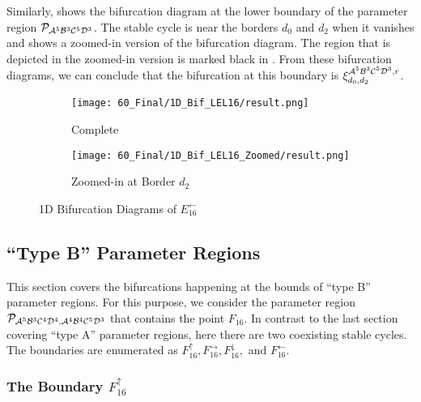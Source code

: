 Similarly,  shows the bifurcation diagram at the lower boundary of the parameter region $\mathcal{P}_{\mathcal{A}^5\mathcal{B}^3\mathcal{C}^5\mathcal{D}^3}$.
The stable cycle is near the borders $d_0$ and $d_2$ when it vanishes and  shows a zoomed-in version of the bifurcation diagram.
The region that is depicted in the zoomed-in version is marked black in .
From these bifurcation diagrams, we can conclude that the bifurcation at this boundary is $\xi_{d_0, d_2}^{\mathcal{A}^5\mathcal{B}^3\mathcal{C}^5\mathcal{D}^3, r}$.

\begin{figure}
    \centering
    \begin{subfigure}{0.4\textwidth}
        \centering
        \texttt{[image: 60\_Final/1D\_Bif\_LEL16/result.png]}
        \caption{Complete}
        \label{fig:final.bifurcation.E.left}
    \end{subfigure}
    \begin{subfigure}{0.4\textwidth}
        \centering
        \texttt{[image: 60\_Final/1D\_Bif\_LEL16\_Zoomed/result.png]}
        \caption{Zoomed-in at Border $d_2$}
        \label{fig:final.bifurcation.E.left.zoomed}
    \end{subfigure}
    \caption{1D Bifurcation Diagrams of $E_{16}^\leftarrow$}
\end{figure}

\subsection{``Type B'' Parameter Regions}

This section covers the bifurcations happening at the bounds of ``type B'' parameter regions.
For this purpose, we consider the parameter region $\mathcal{P}_{\mathcal{A}^5\mathcal{B}^3\mathcal{C}^4\mathcal{D}^4, \mathcal{A}^4\mathcal{B}^4\mathcal{C}^5\mathcal{D}^3}$ that contains the point $F_{16}$.
In contrast to the last section covering ``type A'' parameter regions, here there are two coexisting stable cycles.
The boundaries are enumerated as $F_{16}^\uparrow, F_{16}^\rightarrow, F_{16}^\downarrow,$ and $F_{16}^\leftarrow$.

\subsubsection{The Boundary $F_{16}^\uparrow$}

